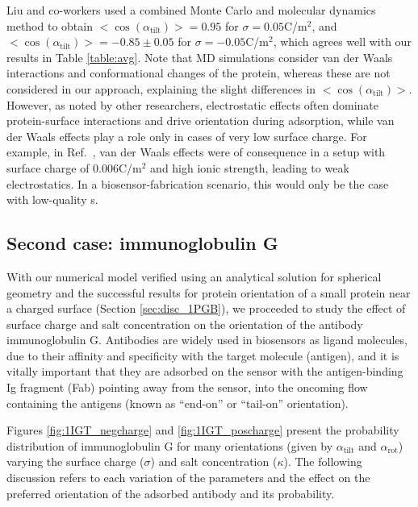 Liu and co-workers \cite{LiuLiaoZhou2013} used a combined Monte Carlo and molecular dynamics method to obtain $<\cos(\alpha_{\text{tilt}})>=0.95$ for $\sigma = 0.05$C/m$^2$, and $<\cos(\alpha_{\text{tilt}})>=-0.85\pm0.05$ for $\sigma = -0.05$C/m$^2$, which agrees well with our results in Table \ref{table:avg}. Note that MD simulations consider van der Waals interactions and conformational changes of the protein, whereas these are not considered in our approach, explaining the slight differences in $<\cos(\alpha_{\text{tilt}})>$.
However, as noted by other researchers,\cite{ZhouChenJiang2003,BaioWeidnerBaughGambleStaytonCastner2012,LiuLiaoZhou2013} electrostatic effects often dominate protein-surface interactions and drive orientation during adsorption, while van der Waals effects play a role only in cases of very low surface charge. For example, in Ref.~, van der Waals effects were of consequence in a setup with surface charge of 0.006C/m$^{2}$ and high ionic strength, leading to weak electrostatics. In a biosensor-fabrication scenario, this would only be the case with low-quality \sam s.

 \subsection{Second case: immunoglobulin G}
 
 With our numerical model verified using an analytical solution for spherical geometry\cite{CooperBarba2015a} and the successful results for protein orientation of a small protein near a charged surface (Section \ref{sec:disc_1PGB}), we proceeded to study the effect of surface charge and salt concentration on the orientation of the antibody immunoglobulin G. Antibodies are widely used in biosensors as ligand molecules, due to their affinity and specificity with the target molecule (antigen), and it is vitally important that they are adsorbed on the sensor with the antigen-binding Ig fragment (Fab) pointing away from the sensor, into the oncoming flow containing the antigens (known as ``end-on'' or ``tail-on'' orientation).
 
 Figures \ref{fig:1IGT_negcharge} and \ref{fig:1IGT_poscharge} present the probability distribution of immunoglobulin G for many orientations (given by $\alpha_\text{tilt}$ and $\alpha_\text{rot}$) varying the surface charge ($\sigma$) and salt concentration ($\kappa$). 
 The following discussion refers to each variation of the parameters and the effect on the preferred orientation of the adsorbed antibody and its probability.

